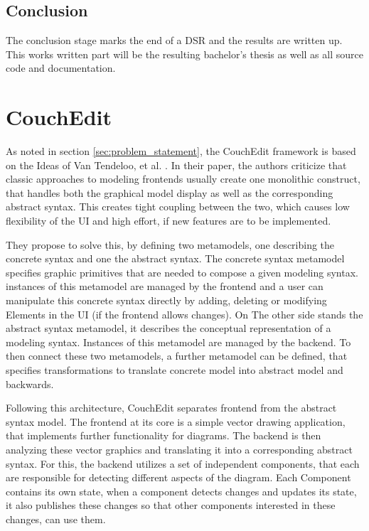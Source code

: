 \subsection{Conclusion}
The conclusion stage marks the end of a DSR and the results are written up. This works written part will be the resulting bachelor's thesis as well as all source code and documentation.


\section{CouchEdit}
As noted in section \ref{sec:problem_statement}, the CouchEdit framework is based on the Ideas of Van Tendeloo, et al. \cite{van_tendeloo_concrete_2017}. In their paper, the authors criticize that classic approaches to modeling frontends usually create one monolithic construct, that handles both the graphical model display as well as the corresponding abstract syntax. This creates tight coupling between the two, which causes low flexibility of the UI and high effort, if new features are to be implemented. 

They propose to solve this, by defining two metamodels, one describing the concrete syntax and one the abstract syntax. The concrete syntax metamodel specifies graphic primitives that are needed to compose a given modeling syntax. instances of this metamodel are managed by the frontend and a user can manipulate this concrete syntax directly by adding, deleting or modifying Elements in the UI (if the frontend allows changes). On The other side stands the abstract syntax metamodel, it describes the conceptual representation of a modeling syntax. Instances of this metamodel are managed by the backend. To then connect these two metamodels, a further metamodel can be defined, that specifies transformations to translate concrete model into abstract model and backwards. 

Following this architecture, CouchEdit separates frontend from the abstract syntax model. The frontend at its core is a simple vector drawing application, that implements further functionality for diagrams. The backend is then analyzing these vector graphics and translating it into a corresponding abstract syntax. For this, the backend utilizes a set of independent components, that each are responsible for detecting different aspects of the diagram. Each Component contains its own state, when a component detects changes and updates its state, it also publishes these changes so that other components interested in these changes, can use them.  

